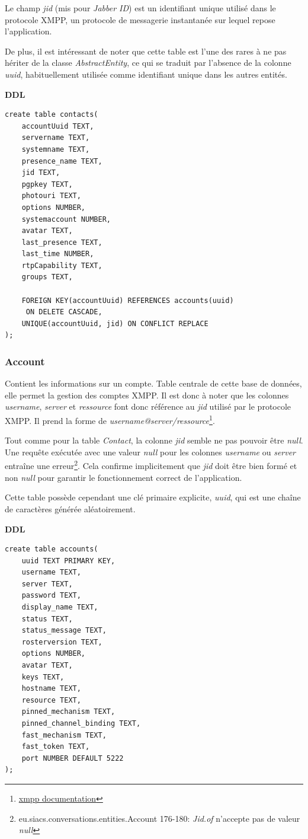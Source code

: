 \documentclass[a4paper,11pt]{article}
\begin{document}
Le champ \textit{jid} (mis pour \textit{Jabber ID}) est un identifiant unique utilisé dans le protocole XMPP, un protocole de messagerie instantanée sur lequel repose l'application.

De plus, il est intéressant de noter que cette table est l'une des rares à ne pas hériter de la classe \textit{AbstractEntity}, ce qui se traduit par l'absence de la colonne \textit{uuid}, habituellement utilisée comme identifiant unique dans les autres entités.

\textbf{DDL}
\begin{lstlisting}
create table contacts(
    accountUuid TEXT,
    servername TEXT, 
    systemname TEXT,
    presence_name TEXT,
    jid TEXT,
    pgpkey TEXT,
    photouri TEXT,
    options NUMBER,
    systemaccount NUMBER,
    avatar TEXT,
    last_presence TEXT,
    last_time NUMBER, 
    rtpCapability TEXT,
    groups TEXT, 
    
    FOREIGN KEY(accountUuid) REFERENCES accounts(uuid) 
     ON DELETE CASCADE,
    UNIQUE(accountUuid, jid) ON CONFLICT REPLACE
);
\end{lstlisting}
\subsubsection*{Account}
Contient les informations sur un compte. Table centrale de cette base de données, elle permet la gestion des comptes XMPP. Il est donc à noter que les colonnes \textit{username}, \textit{server} et \textit{ressource} font donc référence au \textit{jid} utilisé par le protocole XMPP. Il prend la forme de \textit{username@server/ressource}\footnote{\href{https://xmpp.org/extensions/xep-0029.html}{xmpp documentation}}.

Tout comme pour la table \textit{Contact}, la colonne \textit{jid} semble ne pas pouvoir être \textit{null}. Une requête exécutée avec une valeur \textit{null} pour les colonnes \textit{username} ou \textit{server} entraîne une erreur\footnote{eu.siacs.conversations.entities.Account 176-180: \textit{Jid.of} n'accepte pas de valeur \textit{null}}. Cela confirme implicitement que \textit{jid} doit être bien formé et non \textit{null} pour garantir le fonctionnement correct de l'application.

Cette table possède cependant une clé primaire explicite, \textit{uuid}, qui est une chaîne de caractères générée aléatoirement.

\textbf{DDL}
\begin{lstlisting}
create table accounts(
    uuid TEXT PRIMARY KEY,
    username TEXT,
    server TEXT,
    password TEXT,
    display_name TEXT,
    status TEXT,
    status_message TEXT,
    rosterversion TEXT,
    options NUMBER,
    avatar TEXT,
    keys TEXT,
    hostname TEXT,
    resource TEXT,
    pinned_mechanism TEXT,
    pinned_channel_binding TEXT,
    fast_mechanism TEXT,
    fast_token TEXT,
    port NUMBER DEFAULT 5222
);
\end{lstlisting}
\end{document}
